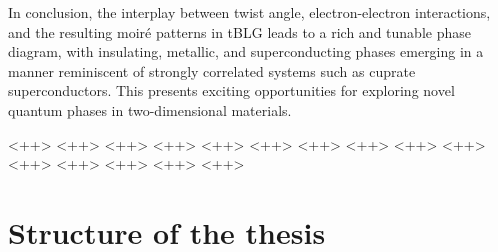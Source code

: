 In conclusion, the interplay between twist angle, electron-electron interactions, and the resulting moiré patterns in tBLG leads to a rich and tunable phase diagram, with insulating, metallic, and superconducting phases emerging in a manner reminiscent of strongly correlated systems such as cuprate superconductors. This presents exciting opportunities for exploring novel quantum phases in two-dimensional materials.

<++> <++> <++> <++> <++> <++> <++> <++> <++> <++> <++> <++> <++> <++> <++>

\section{Structure of the thesis} \label{sec:outline_thesis}




%



